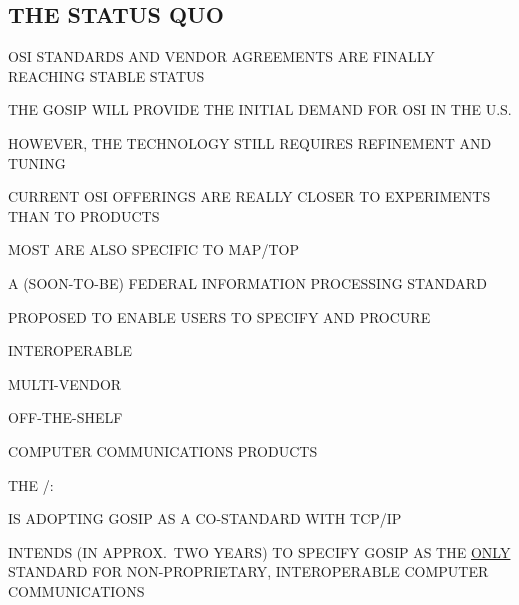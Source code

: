 \begin{bwslide}
\part*	{THE STATUS QUO}\bf

\begin{nrtc}
\item	OSI STANDARDS AND VENDOR AGREEMENTS ARE FINALLY REACHING STABLE STATUS

\item	THE GOSIP WILL PROVIDE THE INITIAL DEMAND FOR OSI IN THE U.S.

\item	HOWEVER, THE TECHNOLOGY STILL REQUIRES REFINEMENT AND TUNING
    \begin{nrtc}
    \item	CURRENT OSI OFFERINGS ARE REALLY CLOSER TO EXPERIMENTS THAN TO
		PRODUCTS

    \item	MOST ARE ALSO SPECIFIC TO MAP/TOP
    \end{nrtc}
\end{nrtc}
\end{bwslide}


\begin{bwslide}

\begin{nrtc}
\item	A (SOON-TO-BE) FEDERAL INFORMATION PROCESSING STANDARD

\item	PROPOSED TO ENABLE USERS TO SPECIFY AND PROCURE
	\begin{nrtc}
	\item	INTEROPERABLE

	\item	MULTI-VENDOR

	\item	OFF-THE-SHELF
	\end{nrtc}
	COMPUTER COMMUNICATIONS PRODUCTS

\item	THE \dod/:
    \begin{nrtc}
    \item	IS ADOPTING GOSIP AS A CO-STANDARD WITH TCP/IP

    \item	INTENDS (IN APPROX.~TWO YEARS) TO SPECIFY GOSIP AS THE 
		\underline{ONLY} STANDARD FOR NON-PROPRIETARY, INTEROPERABLE
		COMPUTER COMMUNICATIONS
    \end{nrtc}
\end{nrtc}
\end{bwslide}


